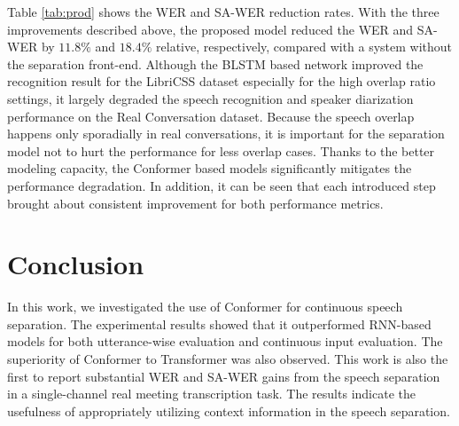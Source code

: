 \documentclass{article}
\begin{document}
	
	Table  \ref{tab:prod} shows the WER and SA-WER reduction rates. 
	With the three improvements described above, the proposed model reduced the WER and SA-WER by  $11.8\%$ and $18.4\%$ relative, respectively, compared with a system without the separation front-end. Although the BLSTM based network improved the recognition result for the LibriCSS dataset especially for the high overlap ratio settings, it largely degraded the speech recognition and speaker diarization performance on the Real Conversation dataset. Because the speech overlap happens only sporadially in real conversations, it is important for the separation model not to hurt the performance for less overlap cases. 
Thanks to the better modeling capacity, the Conformer based models significantly mitigates the performance degradation. In addition, it can be seen that each introduced step brought about consistent improvement for both performance metrics. 


	


	
	\section{Conclusion}
	In this work, we investigated the use of Conformer for continuous speech separation. The experimental results showed that it  outperformed  RNN-based models for both utterance-wise evaluation and continuous input evaluation. 
	The superiority of Conformer to Transformer was also observed. 
	This work is also the first to report 
	substantial WER and SA-WER gains from the speech separation in a single-channel real meeting transcription task. 
	The results indicate the usefulness of appropriately utilizing context information in the speech separation. 
	
	


	

	
	
\end{document}
